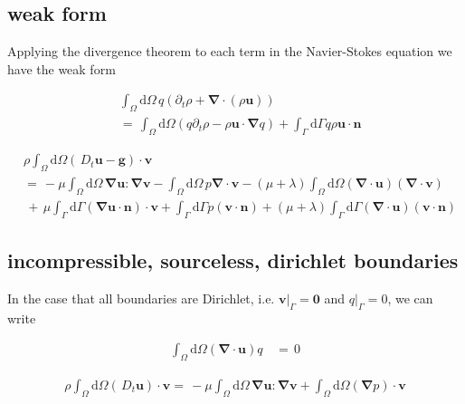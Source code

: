 \documentclass[11pt,a4paper]{report}
\begin{document}
\subsection{weak form}

Applying the divergence theorem to each term in the Navier-Stokes equation we have the weak form

\begin{subequations}
\begin{align}
&\int_{\Omega}\mathrm{d}\Omega\, q\left(\partial_{t}\rho+\boldsymbol{\nabla}\cdot(\rho\boldsymbol{u})\right) \\
&=\,\int_{\Omega}\mathrm{d}\Omega\left(q\partial_{t}\rho-\rho\boldsymbol{u}\cdot\boldsymbol{\nabla}q\right)+\int_{\Gamma}\mathrm{d}\Gamma q\rho\boldsymbol{u}\cdot\boldsymbol{n}
\end{align}
\end{subequations}

\begin{subequations}
\begin{align}
&\rho\int_{\Omega}\mathrm{d}\Omega\left(\,D_{t}\boldsymbol{u}-\boldsymbol{g}\right)\cdot\boldsymbol{v}\\
&=\,-\mu\int_{\Omega}\mathrm{d}\Omega\,\boldsymbol{\nabla}
\boldsymbol{u}:\boldsymbol{\nabla}
\boldsymbol{v}-\int_{\Omega}\mathrm{d}\Omega\,p\boldsymbol{\nabla}
\cdot\boldsymbol{v}-(\mu+\lambda)\int_{\Omega}\mathrm{d}\Omega (\boldsymbol{\nabla}\cdot\boldsymbol{u})(\boldsymbol{\nabla}\cdot\boldsymbol{v}) \\
&\,+\,\mu\int_{\Gamma}\mathrm{d}\Gamma(\boldsymbol{\nabla}\boldsymbol{u}\cdot\boldsymbol{n})\cdot\boldsymbol{v}+\int_{\Gamma}\mathrm{d}\Gamma p (\boldsymbol{v}\cdot\boldsymbol{n})+(\mu+\lambda)\int_{\Gamma}\mathrm{d}\Gamma (\boldsymbol{\nabla}\cdot\boldsymbol{u})(\boldsymbol{v}\cdot\boldsymbol{n})
\end{align}
\end{subequations}

\subsection{incompressible, sourceless, dirichlet boundaries}

In the case that all boundaries are Dirichlet, i.e. $\boldsymbol{v}|_{\Gamma}=\boldsymbol{0}$ and $q|_{\Gamma}=0$, we can write

\begin{subequations}
\begin{align}
\int_{\Omega}\mathrm{d}\Omega\left(\boldsymbol{\nabla}\cdot\boldsymbol{u}\right)q &\,=\, 0
\end{align}
\end{subequations}

\begin{subequations}
\begin{align}
\rho\int_{\Omega}\mathrm{d}\Omega\left(\,D_{t}\boldsymbol{u}\right)\cdot\boldsymbol{v}
=\,-\mu\int_{\Omega}\mathrm{d}\Omega\,\boldsymbol{\nabla}
\boldsymbol{u}:\boldsymbol{\nabla}
\boldsymbol{v}+\int_{\Omega}\mathrm{d}\Omega\left(\boldsymbol{\nabla}p\right)\cdot\boldsymbol{v}
\end{align}
\end{subequations}
\end{document}
